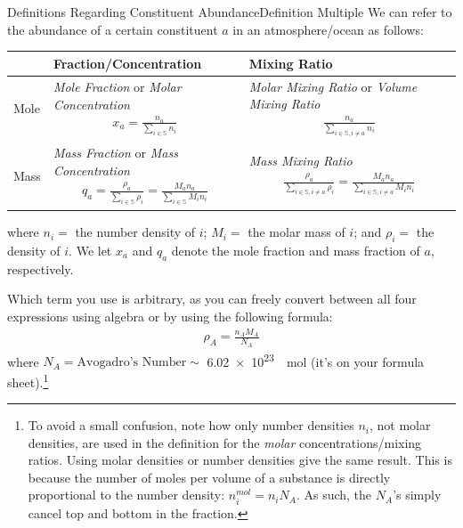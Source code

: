 \begin{fact}{Definitions Regarding Constituent Abundance}{Definition Multiple}\label{b Definition Multiple}
    We can refer to the abundance of a certain constituent \(a\) in an atmosphere/ocean as follows:\newline\newline
    \begin{tabular}{|p{0.8cm}|p{6.5cm}|p{7.5cm}|}
        \hline
        & Fraction/Concentration & Mixing Ratio \\
        \hline
        Mole & \textit{Mole Fraction} or \textit{Molar Concentration} \begin{align*}
            x_a=\frac{n_a}{\sum\limits_{i\in\mathbb{S}} n_i}
        \end{align*} & \textit{Molar Mixing Ratio} or \textit{Volume Mixing Ratio} \begin{align*}
            \frac{n_a}{\sum\limits_{i\in\mathbb{S},i\neq a} n_i}
        \end{align*}
        \\
        \hline
        Mass & \textit{Mass Fraction} or \textit{Mass Concentration} \begin{align*}
            q_a=\frac{\rho_a}{\sum\limits_{i\in\mathbb{S}} \rho_i}
            =
            \frac{M_an_a}{\sum\limits_{i\in\mathbb{S}} M_in_i}
        \end{align*} & \textit{Mass Mixing Ratio} \begin{align*}
            \frac{\rho_a}{\sum\limits_{i\in\mathbb{S},i\neq a} \rho_i}
            =
            \frac{M_an_a}{\sum\limits_{i\in\mathbb{S},i\neq a} M_in_i}
        \end{align*}\\
        \hline
    \end{tabular}\newline

    where \(n_i=\) the number density of \(i\); \(M_i=\) the molar mass of \(i\); and \(\rho_i=\) the density of \(i\). We let \(x_a\) and \(q_a\) denote the mole fraction and mass fraction of \(a\), respectively.

    Which term you use is arbitrary, as you can freely convert between all four expressions using algebra or by using the following formula:
    \begin{align}\label{eq density to number}
        \rho_A=\frac{n_AM_A}{N_A}
    \end{align}
    where \(N_A=\text{Avogadro's Number}\sim\) \qty{6.02e23}{\per\mole} (it's on your formula sheet).\footnote{
        To avoid a small confusion, note how only number densities \(n_i\), not molar densities, are used in the definition for the \textit{molar} concentrations/mixing ratios. Using molar densities or number densities give the same result. This is because the number of moles per volume of a substance is directly proportional to the number density: \(n_i^{mol}=n_iN_A\). As such, the \(N_A\)'s simply cancel top and bottom in the fraction.
    } 
\end{fact}

